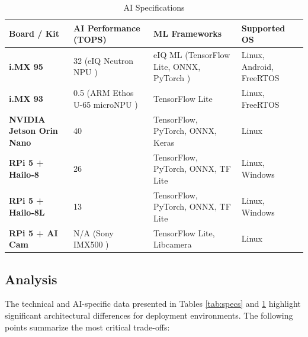 \begin{table}[H]
    \centering
    \caption{\acrshort{AI} Specifications}
    \label{tab:ai-specs}
    \renewcommand{\arraystretch}{1.6}
    \begin{tabular}{p{} p{} p{} p{}}
        \toprule
        \textbf{Board / Kit} & \textbf{\gls{AI} Performance (\gls{TOPS})} & \textbf{\gls{ML} Frameworks} & \textbf{Supported \acrshort{OS}} \\
        \midrule
        
        \textbf{i.MX 95} & 32 (eIQ Neutron \gls{NPU} \cite{mariasSpotlightEdgeAI2025}) & eIQ \acrshort{ML} (TensorFlow Lite, ONNX, PyTorch \cite{EIQMLSoftware}) & Linux, Android, FreeRTOS \\
        
        \textbf{i.MX 93} & 0.5 (\acrshort{ARM} Ethos U-65 micro\gls{NPU} \cite{NXPIMX93}) & TensorFlow Lite \cite{AN13854NPUMigration} & Linux, FreeRTOS \\
        
        \textbf{NVIDIA Jetson Orin Nano} & 40 & TensorFlow, PyTorch, ONNX, Keras & Linux \\
        
        \textbf{\gls{RPi} 5 + Hailo-8} & 26 & TensorFlow, PyTorch, ONNX, TF Lite & Linux, Windows \\
        
        \textbf{\gls{RPi} 5 + Hailo-8L} & 13 & TensorFlow, PyTorch, ONNX, TF Lite & Linux, Windows \\
        
        \textbf{\gls{RPi} 5 + \acrshort{AI} Cam} & N/A (Sony IMX500 \cite{IMX500DeveloperWorld} \cite{dakicRaspberryPiAI2024}) & TensorFlow Lite, Libcamera & Linux \\
        
        \bottomrule
    \end{tabular}
\end{table}

\subsection{Analysis}

The technical and \gls{AI}-specific data presented in Tables \ref{tab:specs} and \ref{tab:ai-specs} highlight significant architectural differences for deployment environments. The following points summarize the most critical trade-offs:

